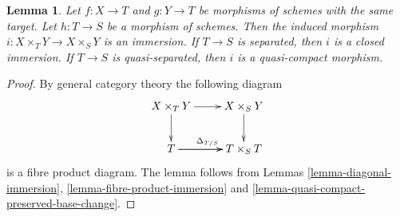\documentclass{stacks-project}
\theoremstyle{plain}
\newtheorem{lemma}[subsection]{Lemma}
\theoremstyle{definition}
\theoremstyle{remark}
\numberwithin{equation}{subsection}
\begin{document}
\begin{lemma}
\label{lemma-fibre-product-after-map}
Let $f : X \to T$ and $g : Y \to T$ be morphisms of schemes
with the same target. Let $h : T \to S$ be a morphism of schemes.
Then the induced morphism $i : X \times_T Y \to X \times_S Y$ is
an immersion. If $T \to S$ is separated, then $i$ is a closed
immersion. If $T \to S$ is quasi-separated, then $i$ is a
quasi-compact morphism.
\end{lemma}

\begin{proof}
By general category theory the following diagram
$$
\xymatrix{
X \times_T Y \ar[r] \ar[d] & X \times_S Y \ar[d] \\
T \ar[r]^{\Delta_{T/S}} \ar[r] & T \times_S T
}
$$
is a fibre product diagram. The lemma follows
from Lemmas \ref{lemma-diagonal-immersion},
\ref{lemma-fibre-product-immersion} and
\ref{lemma-quasi-compact-preserved-base-change}.
\end{proof}
\end{document}
